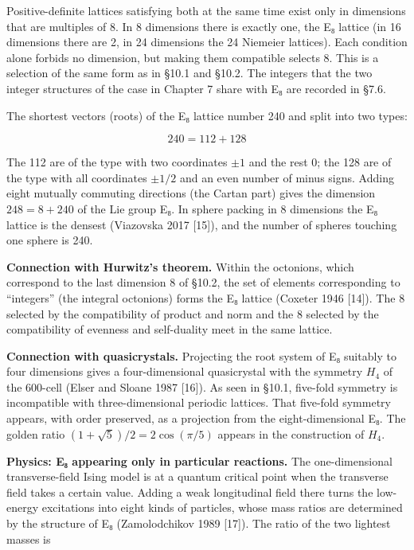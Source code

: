 \documentclass[
  a4paper,
]{article}
\begin{document}
Positive-definite lattices satisfying both at the same time exist only
in dimensions that are multiples of 8. In 8 dimensions there is exactly
one, the E₈ lattice (in 16 dimensions there are 2, in 24 dimensions the
24 Niemeier lattices). Each condition alone forbids no dimension, but
making them compatible selects 8. This is a selection of the same form
as in §10.1 and §10.2. The integers that the two integer structures of
the case in Chapter 7 share with E₈ are recorded in §7.6.

The shortest vectors (roots) of the E₈ lattice number 240 and split into
two types:

\[
240=112+128
\tag{15}
\]

The 112 are of the type with two coordinates \(\pm1\) and the rest 0;
the 128 are of the type with all coordinates \(\pm1/2\) and an even
number of minus signs. Adding eight mutually commuting directions (the
Cartan part) gives the dimension \(248=8+240\) of the Lie group E₈. In
sphere packing in 8 dimensions the E₈ lattice is the densest (Viazovska
2017 {[}15{]}), and the number of spheres touching one sphere is 240.

\textbf{Connection with Hurwitz's theorem.} Within the octonions, which
correspond to the last dimension 8 of §10.2, the set of elements
corresponding to ``integers'' (the integral octonions) forms the E₈
lattice (Coxeter 1946 {[}14{]}). The 8 selected by the compatibility of
product and norm and the 8 selected by the compatibility of evenness and
self-duality meet in the same lattice.

\textbf{Connection with quasicrystals.} Projecting the root system of E₈
suitably to four dimensions gives a four-dimensional quasicrystal with
the symmetry \(H_4\) of the 600-cell (Elser and Sloane 1987 {[}16{]}).
As seen in §10.1, five-fold symmetry is incompatible with
three-dimensional periodic lattices. That five-fold symmetry appears,
with order preserved, as a projection from the eight-dimensional E₈. The
golden ratio \((1+\sqrt5)/2=2\cos(\pi/5)\) appears in the construction
of \(H_4\).

\textbf{Physics: E₈ appearing only in particular reactions.} The
one-dimensional transverse-field Ising model is at a quantum critical
point when the transverse field takes a certain value. Adding a weak
longitudinal field there turns the low-energy excitations into eight
kinds of particles, whose mass ratios are determined by the structure of
E₈ (Zamolodchikov 1989 {[}17{]}). The ratio of the two lightest masses
is
\end{document}
